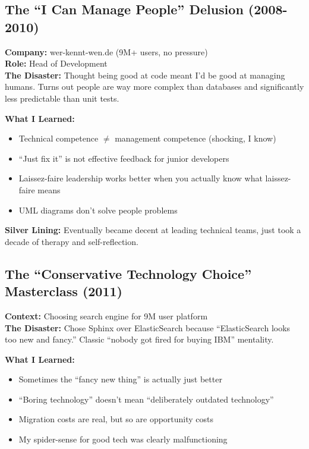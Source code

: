 \documentclass[11pt,a4paper]{article}
\begin{document}
\subsection{The ``I Can Manage People'' Delusion (2008-2010)}
\textbf{Company:} wer-kennt-wen.de (9M+ users, no pressure)\\
\textbf{Role:} Head of Development\\
\textbf{The Disaster:} Thought being good at code meant I'd be good at managing humans. Turns out people are way more complex than databases and significantly less predictable than unit tests.

\textbf{What I Learned:} 
\begin{itemize}[leftmargin=1.5em, itemsep=0.1em]
\item Technical competence $\neq$ management competence (shocking, I know)
\item ``Just fix it'' is not effective feedback for junior developers
\item Laissez-faire leadership works better when you actually know what laissez-faire means
\item UML diagrams don't solve people problems
\end{itemize}

\textbf{Silver Lining:} Eventually became decent at leading technical teams, just took a decade of therapy and self-reflection.

\subsection{The ``Conservative Technology Choice'' Masterclass (2011)}
\textbf{Context:} Choosing search engine for 9M user platform\\
\textbf{The Disaster:} Chose Sphinx over ElasticSearch because ``ElasticSearch looks too new and fancy.'' Classic ``nobody got fired for buying IBM'' mentality.

\textbf{What I Learned:} 
\begin{itemize}[leftmargin=1.5em, itemsep=0.1em]
\item Sometimes the ``fancy new thing'' is actually just better
\item ``Boring technology'' doesn't mean ``deliberately outdated technology''
\item Migration costs are real, but so are opportunity costs
\item My spider-sense for good tech was clearly malfunctioning
\end{itemize}
\end{document}
